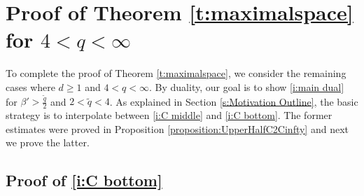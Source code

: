 \documentclass[a4paper]{amsart}
\numberwithin{equation}{section}%
\theoremstyle{plain}%
\theoremstyle{definition}
\theoremstyle{remark}%
\begin{document}
\section{Proof of Theorem \ref{t:maximalspace} for $4 < q < \infty$} \label{s:lower half}

To complete the proof of Theorem \ref{t:maximalspace}, we consider the remaining cases where $d \geq 1$ and $4<q<\infty$. By duality, our goal is to show \eqref{i:main dual} for $\beta'>\frac{\widetilde{q}}{2}$ and $2<\widetilde{q}<4$. As explained in Section \ref{s:Motivation Outline}, the basic strategy is to interpolate between \eqref{i:C middle} and \eqref{i:C bottom}. The former estimates were proved in Proposition \ref{proposition:UpperHalfC2Cinfty} and next we prove the latter.

\subsection{Proof of \eqref{i:C bottom}}
\end{document}
